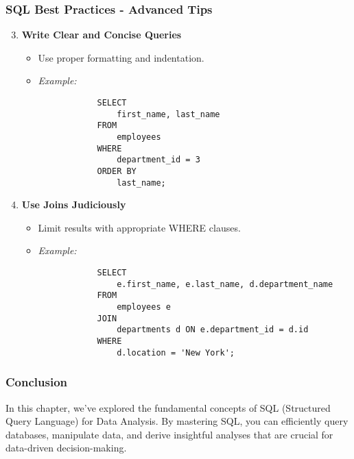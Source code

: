 \documentclass{beamer}
\begin{document}
\begin{frame}[fragile]
    \frametitle{SQL Best Practices - Advanced Tips}
    
    \begin{enumerate}
        \setcounter{enumi}{2}
        \item \textbf{Write Clear and Concise Queries}
        \begin{itemize}
            \item Use proper formatting and indentation.
            \item \textit{Example:}
            \begin{lstlisting}
            SELECT 
                first_name, last_name 
            FROM 
                employees 
            WHERE 
                department_id = 3 
            ORDER BY 
                last_name;
            \end{lstlisting}
        \end{itemize}

        \item \textbf{Use Joins Judiciously}
        \begin{itemize}
            \item Limit results with appropriate WHERE clauses.
            \item \textit{Example:}
            \begin{lstlisting}
            SELECT 
                e.first_name, e.last_name, d.department_name 
            FROM 
                employees e
            JOIN 
                departments d ON e.department_id = d.id
            WHERE 
                d.location = 'New York';
            \end{lstlisting}
        \end{itemize}
    \end{enumerate}
\end{frame}

\begin{frame}[fragile]
    \frametitle{Conclusion}
    In this chapter, we've explored the fundamental concepts of SQL (Structured Query Language) for Data Analysis. By mastering SQL, you can efficiently query databases, manipulate data, and derive insightful analyses that are crucial for data-driven decision-making.
\end{frame}
\end{document}
